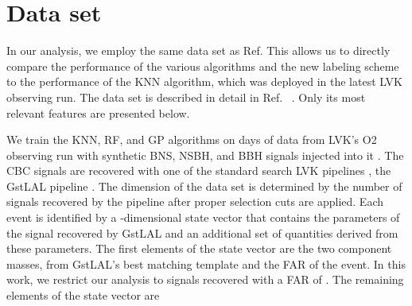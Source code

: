 \section{Data set\label{dataset}}
\label{sec:dataset}

In our analysis, we employ the same data set as Ref. \cite{Chatterjee:2019avs} This allows us to directly compare the performance of the various algorithms and the new labeling
scheme to the performance of the \ac{KNN} algorithm, which was deployed in the latest \ac{LVK} observing run. The data set is described in detail in Ref.\  . Only its most relevant features are presented below.

We train the \ac{KNN}, \ac{RF}, and \ac{GP} algorithms on  days of data  from \ac{LVK}'s \ac{O2} observing run with  synthetic \ac{BNS}, \ac{NSBH}, and \ac{BBH} signals
injected into it .  The \ac{CBC} signals are recovered with one of the standard search \ac{LVK} pipelines , the GstLAL
pipeline .  The dimension of the data set is determined by the number of signals recovered by the pipeline after
proper selection cuts are applied. Each event is identified by a -dimensional state vector that contains the parameters of the signal recovered by GstLAL and an additional set of
quantities derived from these parameters. The first  elements of the state vector are the two component masses,  from GstLAL's best matching
template and the \ac{FAR} of the event. In this work, we restrict our analysis to signals recovered with a \ac{FAR} of .  The remaining elements of the state
vector are  


